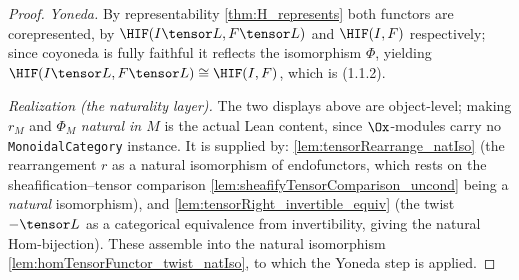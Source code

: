\begin{lemma}
\begin{proof}
    \emph{Yoneda.} By representability \cref{thm:H_represents} both functors are
    corepresented, by $\HIF(I\tensor L, F\tensor L)$ and $\HIF(I,F)$ respectively;
    since $\mathrm{coyoneda}$ is fully faithful it reflects the isomorphism $\Phi$,
    yielding $\HIF(I\tensor L, F\tensor L) \cong \HIF(I,F)$, which is
    \textnormal{(1.1.2)}.

    \emph{Realization (the naturality layer).} The two displays above are object-level;
    making $r_M$ and $\Phi_M$ \emph{natural in $M$} is the actual Lean content, since
    $\Ox$-modules carry no \texttt{MonoidalCategory} instance. It is supplied by:
    \cref{lem:tensorRearrange_natIso} (the rearrangement $r$ as a natural isomorphism of
    endofunctors, which rests on the sheafification--tensor comparison
    \cref{lem:sheafifyTensorComparison_uncond} being a \emph{natural} isomorphism), and
    \cref{lem:tensorRight_invertible_equiv} (the twist $-\tensor L$ as a categorical
    equivalence from invertibility, giving the natural Hom-bijection). These assemble
    into the natural isomorphism \cref{lem:homTensorFunctor_twist_natIso}, to which the
    Yoneda step is applied.
  \end{proof}
\end{lemma}

